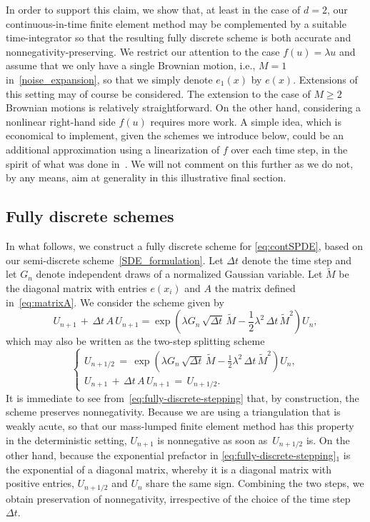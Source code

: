 \documentclass[12pt]{article}
\begin{document}
{In order to support this claim, we show that, at least in the case of $d=2$, our continuous-in-time finite element method may be complemented by a suitable time-integrator so that the resulting fully discrete scheme is both accurate and nonnegativity-preserving.  
We restrict our attention to the case $f(u) = \lambda u$ and assume that we only have a single Brownian motion, i.e., $M=1$ in~\eqref{noise_expansion}, so that we simply denote $e_1(x)$ by $e(x)$. 
Extensions of this setting may of course be considered. The extension to the case of $M\geq 2$ Brownian motions is relatively straightforward. On the other hand, considering a nonlinear right-hand side $f(u)$ requires more work. A simple idea, which is economical to implement, given the schemes we introduce below, could be an additional approximation using a linearization of $f$ over each time step, in the spirit of what was done in~\cite{brehier2023analysis}. We will not comment on this further as we do not, by any means, aim at generality in this illustrative final section. 


\subsection{Fully discrete schemes}

In what follows, we construct a fully discrete scheme for \eqref{eq:contSPDE}, based on our semi-discrete scheme~\eqref{SDE_formulation}. 
Let $\Delta t$ denote the time step and let $G_n$ denote independent draws of a normalized Gaussian variable. 
Let $\tilde{M}$ be the diagonal matrix with entries $e(x_i)$ and $A$ the matrix defined in~\eqref{eq:matrixA}. We consider the scheme given by
\begin{equation}
\label{eq:fully-discrete}
U_{n+1}\, + \,\Delta t \,A\,U_{n+1} = \exp \left(\lambda G_n\, \sqrt{\Delta t}\, \tilde{M} - \frac{1}{2} \lambda^2\, \Delta t\, \tilde{M}^{2} \right) U_n,
\end{equation}
which may also be written as the two-step splitting scheme
\begin{equation}
\label{eq:fully-discrete-stepping}
  \left\{
  \begin{array}{l}
  U_{n+1/2}\,=\, \exp \left(\lambda G_n \,\sqrt{\Delta t}\, \tilde{M} - \frac{1}{2} \lambda^2\, \Delta t \, \tilde{M}^{2} \right) U_n,\\
    U_{n+1}\, + \,\Delta t \,A\,U_{n+1} \,= \,  U_{n+1/2}.
     \end{array}
\right.
\end{equation}
It is immediate to see from~\eqref{eq:fully-discrete-stepping} that, by construction, the scheme preserves nonnegativity. Because we are using a triangulation that is weakly acute, so that our mass-lumped finite element method has this property in the deterministic setting, $U_{n+1}$ is nonnegative as soon as~$U_{n+1/2}$ is.  On the other hand, because the exponential prefactor in \eqref{eq:fully-discrete-stepping}$_1$ is the exponential of a diagonal matrix, whereby it is a diagonal matrix with positive entries, $U_{n+1/2}$ and $U_{n}$ share the same sign. Combining the two steps, we obtain preservation of nonnegativity, irrespective of the choice of the time step~$\Delta t$.

}
\end{document}
